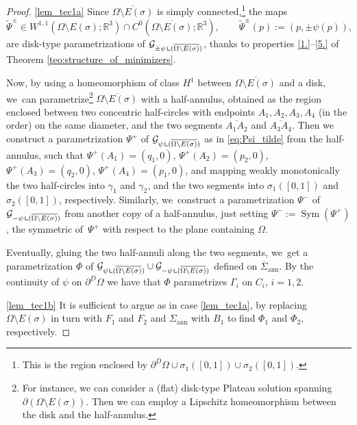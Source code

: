 \documentclass[JEP,XML,SOM,Unicode, NoFloatCountersInSection,published]{cedram}
\DeclareMathOperator{\Sym}{Sym}
\newcommand{\R}{\mathbb{R}}
\let\Om\Omega
\newcommand{\openannulus}{\Sigma_\mathrm{ann}}
\newcommand{\resa}{\mathop{\hbox{\vrule height 7pt width 0.5pt depth 0pt
\vrule height 0.5pt width 6pt depth 0pt}}\nolimits}
\newcommand{\resb}{\mathop{\hbox{\vrule height 4pt width 0.5pt depth 0pt
\vrule height 0.5pt width 3pt depth 0pt}}\nolimits}
\newcommand{\res}{\mathchoice{\resa}{\resa}{\resb}{\resb}}
\theoremstyle{definition}
\begin{document}
\skpt
\begin{proof}
\ref{lem_tec1a}
Since $\overline{\Om\setminus E(\sigma)}$ is simply connected,\footnote{ This is the region enclosed by $\partial^D\Om\cup\sigma_1([0,1])\cup\sigma_2([0,1])$.} the
maps
\begin{equation}\label{eq:Psi_tilde}
\widetilde \Psi^\pm\in W^{1,1}({\Om\setminus E(\sigma)};\R^3)
\cap C^0(\overline{\Om\setminus E(\sigma)};\R^3),
\qquad \widetilde \Psi^\pm(p):=(p,\pm\psi(p)),
\end{equation}
are disk-type parametrizations of $\mathcal G_{\pm\psi\res (\overline{\Om\setminus E(\sigma)})}$, thanks to properties \ref{1.}--\ref{5.} of Theorem \ref{teo:structure_of_minimizers}.

Now, by using a homeomorphism of class $H^1$ between $\overline{\Om\setminus E(\sigma)}$ and a disk, we~can parametrize\footnote{For instance,
we can consider a (flat) disk-type Plateau solution
spanning $\partial(\Om\setminus E(\sigma))$.
Then we can employ a Lipschitz homeomorphism between the disk and the
half-annulus.}
$\overline{\Om\setminus E(\sigma)}$ with a half-annulus, obtained as the region enclosed between two concentric half-circles
with endpoints $A_1,A_2,A_3,A_4$ (in the order) on the same diameter, and the two segments $\overline{A_1A_2}$ and $\overline{A_3A_4}$.
Then we construct a parametrization $\Psi^+$
of $\mathcal G_{\psi\res (\overline{\Om\setminus E(\sigma)})}$ as in \eqref{eq:Psi_tilde} from the
half-annulus, such that $\Psi^+(A_1)=(q_1,0)$, $\Psi^+(A_2)=(p_2,0)$, $\Psi^+(A_3)=(q_2,0)$, $\Psi^+(A_4)=(p_1,0)$, and mapping weakly monotonically the two
half-circles
into $\gamma_1$ and $\gamma_2$, and the two segments into $\sigma_1([0,1])$ and
$\sigma_2([0,1])$, respectively.
Similarly, we~construct a parametrization $\Psi^-$ of $\mathcal G_{-\psi\res (\overline{\Om\setminus E(\sigma)})}$ from
another copy of a half-annulus, just
setting $\Psi^-:=\Sym(\Psi^+)$,
the symmetric of~$\Psi^+$ with respect to the plane containing $\Omega$.

Eventually, gluing the two half-annuli
along the two segments, we~get a parametrization $\Phi$
of $\mathcal G_{\psi\res (\overline{\Om\setminus E(\sigma)})}
\cup \mathcal G_{-\psi\res (\overline{\Om\setminus E(\sigma)})}$
defined on $\overline\Sigma_\mathrm{ann}$.
By the continuity of $\psi$ on $\partial^D\Omega$ we have that $ \Phi$ parametrizes $\Gamma_i$ on $C_i$, $i=1,2$.

\ref{lem_tec1b}
It is sufficient to argue as in case \ref{lem_tec1a},
by replacing $\Omega\setminus E(\sigma)$ in turn with $F_1$ and $F_2$ and
$\openannulus$ with $B_1$ to find $\Phi_1$ and $\Phi_2$, respectively.
\end{proof}
\end{document}
